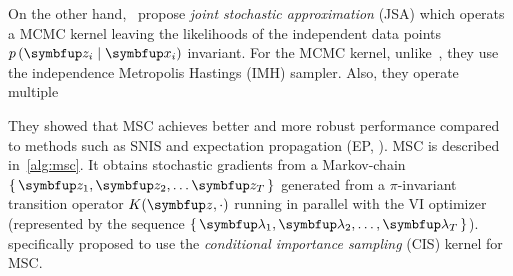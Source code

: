 On the other hand,~\cite{pmlr-v124-ou20a} propose \textit{joint stochastic approximation} (JSA) which operats a MCMC kernel leaving the likelihoods of the independent data points \(p\left(\vz_i \mid \vx_i \right)\) invariant.
For the MCMC kernel, unlike~\citeauthor{NEURIPS2020_b2070693}, they use the independence Metropolis Hastings (IMH) sampler.
Also, they operate multiple 


They showed that MSC achieves better and more robust performance compared to methods such as SNIS and expectation propagation (EP, \citealt{10.5555/2074022.2074067}).
MSC is described in~\cref{alg:msc}.
It obtains stochastic gradients from a Markov-chain \(\{\,\vz_1, \vz_2, \ldots \vz_T\,\}\) generated from a \(\pi\)-invariant transition operator \(K(\vz, \cdot)\) running in parallel with the VI optimizer (represented by the sequence \(\{\,\vlambda_1, \vlambda_2, \ldots, \vlambda_T\,\}\)).
\citeauthor{NEURIPS2020_b2070693} specifically proposed to use the \textit{conditional importance sampling} (CIS) kernel for MSC.




